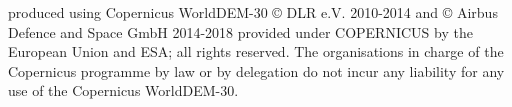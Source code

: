 \documentclass[10pt,a4paper]{article}
\begin{document}
produced using Copernicus WorldDEM-30 \copyright{} DLR e.V. 2010-2014 and
\copyright{} Airbus Defence and Space GmbH 2014-2018 provided under COPERNICUS
by the European Union and ESA; all rights reserved.
The organisations in charge of the Copernicus programme by law or by delegation
do not incur any liability for any use of the Copernicus WorldDEM-30.
\end{document}
